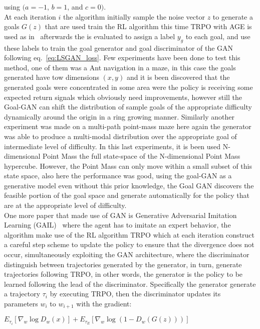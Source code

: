 using $(a = -1$, $b = 1$, and $c = 0)$. \\At each iteration $i$ the algorithm initially sample the noise vector $z$ to generate a goals $G(z)$  that are used train the RL algorithm this time TRPO with AGE is used as in~\cite{schulman2015high} afterwards the is evaluated to assign a label $y_g$ to each goal, and use these labels to train the goal generator and goal discriminator of the GAN following eq.~\ref{eq:LSGAN_loss}. Few experiments have been done to test this method, one of them was a Ant navigation in a maze, in this case the goals generated have tow dimensions $(x,y)$ and it is been discovered that the generated goals were concentrated in some area were the policy is receiving some expected return signals which obviously need improvements, however still the Goal-GAN can shift the distribution of sample goals of the appropriate difficulty dynamically around the origin in a ring growing manner. Similarly another experiment was made on a multi-path point-mass maze here again the generator was able to produce a multi-modal distribution over the appropriate goal of intermediate level of difficulty. In this last experiments, it is been used N-dimensional Point Mass the full state-space of the N-dimensional Point Mass hypercube. However, the Point Mass can only move within a small subset of this state space, also here the performance was good, using the goal-GAN as a generative model even
without this prior knowledge, the Goal GAN discovers the feasible portion of the goal space and generate automatically for the policy that are at the appropriate level of difficulty.\\
One more paper that made use of GAN is Generative Adversarial Imitation Learning (GAIL)~\cite{DBLP:journals/corr/HoE16} where the agent has to imitate an expert behavior, the algorithm make use of the RL algorithm TRPO which at each iteration construct a careful step scheme to update the policy to ensure that the divergence does not occur, simultaneously exploiting the GAN architecture, where the discriminator distinguish between trajectories generated by the generator, in turn, generate trajectories following TRPO, in other words, the generator is the policy to be learned following the lead of the discriminator. Specifically the generator generate a trajectory $\tau_i$ by executing TRPO, then the discriminator updates its parameters $w_i$ to $w_{i+1}$ with the gradient:
\begin{center}
$E_{\tau_i}[\nabla_w\log{D_w(x)}] + E_{\tau_E}[\nabla_w\log{(1-D_w(G(z)))}]$
\end{center}
